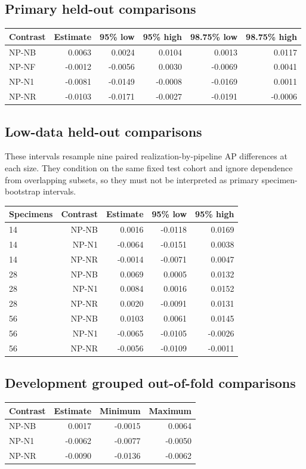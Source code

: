 \subsection{Primary held-out comparisons}
\begin{tabular}{lrrrrr}
\toprule
Contrast & Estimate & 95\% low & 95\% high & 98.75\% low & 98.75\% high \\
\midrule
NP-NB & 0.0063 & 0.0024 & 0.0104 & 0.0013 & 0.0117 \\
NP-NF & -0.0012 & -0.0056 & 0.0030 & -0.0069 & 0.0041 \\
NP-N1 & -0.0081 & -0.0149 & -0.0008 & -0.0169 & 0.0011 \\
NP-NR & -0.0103 & -0.0171 & -0.0027 & -0.0191 & -0.0006 \\
\bottomrule
\end{tabular}
\subsection{Low-data held-out comparisons}
These intervals resample nine paired realization-by-pipeline AP differences at each size. They condition on the same fixed test cohort and ignore dependence from overlapping subsets, so they must not be interpreted as primary specimen-bootstrap intervals.

\begin{tabular}{lrrrr}
\toprule
Specimens & Contrast & Estimate & 95\% low & 95\% high \\
\midrule
14 & NP-NB & 0.0016 & -0.0118 & 0.0169 \\
14 & NP-N1 & -0.0064 & -0.0151 & 0.0038 \\
14 & NP-NR & -0.0014 & -0.0071 & 0.0047 \\
28 & NP-NB & 0.0069 & 0.0005 & 0.0132 \\
28 & NP-N1 & 0.0084 & 0.0016 & 0.0152 \\
28 & NP-NR & 0.0020 & -0.0091 & 0.0131 \\
56 & NP-NB & 0.0103 & 0.0061 & 0.0145 \\
56 & NP-N1 & -0.0065 & -0.0105 & -0.0026 \\
56 & NP-NR & -0.0056 & -0.0109 & -0.0011 \\
\bottomrule
\end{tabular}
\subsection{Development grouped out-of-fold comparisons}
\begin{tabular}{lrrr}
\toprule
Contrast & Estimate & Minimum & Maximum \\
\midrule
NP-NB & 0.0017 & -0.0015 & 0.0064 \\
NP-N1 & -0.0062 & -0.0077 & -0.0050 \\
NP-NR & -0.0090 & -0.0136 & -0.0062 \\
\bottomrule
\end{tabular}
